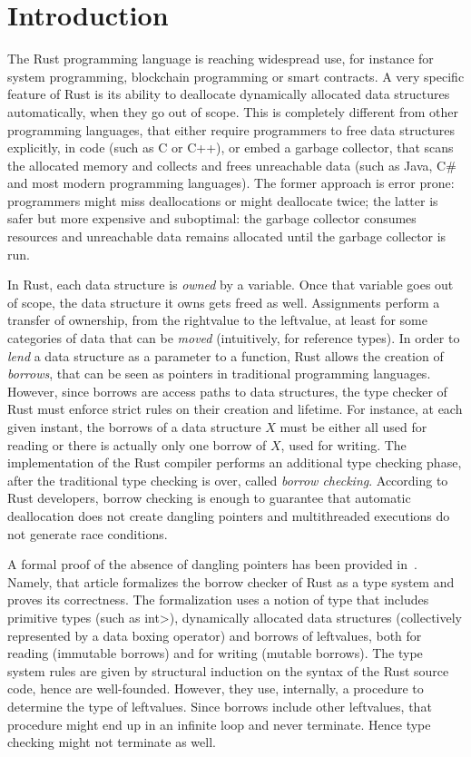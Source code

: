\section{Introduction}\label{sec:introduction}

The Rust programming language is reaching widespread use,
for instance for system programming,
blockchain programming or smart contracts.
A very specific feature of Rust is its ability to deallocate dynamically allocated
data structures automatically, when they go out of scope. This is completely different
from other programming languages, that either require programmers to free data structures
explicitly, in code (such as C or C++), or embed a garbage collector, that scans the allocated memory
and collects and frees unreachable data (such as Java, C\# and most modern programming languages).
The former approach is error prone: programmers might miss deallocations or might deallocate twice;
the latter is safer but more expensive and suboptimal:
the garbage collector consumes resources and unreachable data remains
allocated until the garbage collector is run.

In Rust, each data structure is \emph{owned} by a variable. Once that variable goes
out of scope, the data structure it owns gets freed as well. Assignments perform
a transfer of ownership, from the rightvalue to the leftvalue, at least for some
categories of data that can be \emph{moved} (intuitively, for reference types).
In order to \emph{lend} a data structure as a parameter to a function, Rust allows the
creation of \emph{borrows}, that can be seen as pointers in traditional programming languages.
However, since borrows are access paths to data structures, the type checker of Rust
must enforce strict rules on their creation and lifetime. For instance, at each given
instant, the borrows of a data structure $X$ must be either all used for reading
or there is actually only one borrow of $X$, used for writing.
The implementation of the Rust compiler performs an additional type checking phase,
after the traditional type checking is over,
called \emph{borrow checking}.
According to Rust developers, borrow checking is enough to guarantee that
automatic deallocation does not create dangling pointers and multithreaded
executions do not generate race conditions.

A formal proof of the absence of dangling pointers has been provided in~\cite{Pearce21}.
Namely, that article formalizes the borrow checker of Rust as a type system
and proves its correctness. The formalization uses a notion of type that includes
primitive types (such as \<int>), dynamically allocated data structures
(collectively represented by a data boxing operator) and borrows of leftvalues,
both for reading (immutable borrows)
and for writing (mutable borrows). The type system rules are given by structural induction
on the syntax of the Rust source code, hence are well-founded. However, they use, internally,
a procedure to determine the type of leftvalues. Since borrows include other leftvalues,
that procedure might end up in an infinite loop and never terminate. Hence type checking
might not terminate as well.

